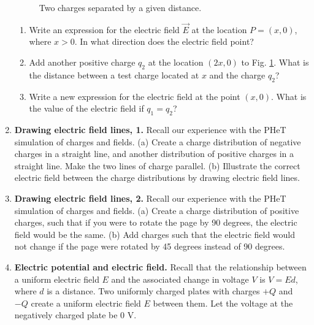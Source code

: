 \documentclass[10pt]{article}
\begin{document}
\begin{enumerate}
\begin{figure}[hb]
\caption{\label{fig:fig2} Two charges separated by a given distance.}
\end{figure}
\begin{enumerate}
\item Write an expression for the electric field $\vec{E}$ at the location $P = (x,0)$, where $x>0$.  In what direction does the electric field point?  \\ \vspace{1cm}
\item Add another positive charge $q_2$ at the location $(2x,0)$ to Fig. \ref{fig:fig2}.  What is the distance between a test charge located at $x$ and the charge $q_2$? \\ \vspace{1cm}
\item Write a new expression for the electric field at the point $(x,0)$.  What is the value of the electric field if $q_1 = q_2$? \\ \vspace{2cm}
\end{enumerate}
\item \textbf{Drawing electric field lines, 1.} Recall our experience with the PHeT simulation of charges and fields.  (a) Create a charge distribution of negative charges in a straight line, and another distribution of positive charges in a straight line.  Make the two lines of charge parallel. (b) Illustrate the correct electric field between the charge distributions by drawing electric field lines. \\ \vspace{4cm}
\item \textbf{Drawing electric field lines, 2.} Recall our experience with the PHeT simulation of charges and fields.  (a) Create a charge distribution of positive charges, such that if you were to rotate the page by 90 degrees, the electric field would be the same.  (b) Add charges such that the electric field would not change if the page were rotated by 45 degrees instead of 90 degrees.  \\ \vspace{4cm}
\item \textbf{Electric potential and electric field.} Recall that the relationship between a uniform electric field $E$ and the associated change in voltage $V$ is $V = Ed$, where $d$ is a distance.  Two uniformly charged plates with charges $+Q$ and $-Q$ create a uniform electric field $E$ between them.  Let the voltage at the negatively charged plate be 0 V.
\begin{enumerate}

\end{enumerate}
\end{enumerate}
\end{document}
